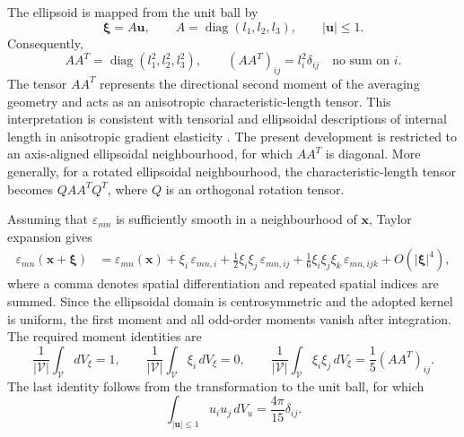 \documentclass[final,3p,times,fleqn]{elsarticle}
\begin{document}
The ellipsoid is mapped from the unit ball by
\[
  \boldsymbol{\xi}=A\mathbf{u},
  \qquad
  A=\operatorname{diag}(l_1,l_2,l_3),
  \qquad
  |\mathbf{u}|\leq 1 .
\]
Consequently,
\begin{equation}\label{eq:AAT}
  AA^T
  =
  \operatorname{diag}(l_1^2,l_2^2,l_3^2),
  \qquad
  (AA^T)_{ij}=l_i^2\delta_{ij}
  \quad \text{no sum on } i .
\end{equation}
The tensor $AA^T$ represents the directional second moment of the
averaging geometry and acts as an anisotropic characteristic-length
tensor. This interpretation is consistent with tensorial and ellipsoidal
descriptions of internal length in anisotropic gradient elasticity
\cite{LazarPo2015,Polizzotto2018,Auffray2019}. The present development
is restricted to an axis-aligned ellipsoidal neighbourhood, for which
$AA^T$ is diagonal. More generally, for a rotated ellipsoidal
neighbourhood, the characteristic-length tensor becomes
$QAA^TQ^T$, where $Q$ is an orthogonal rotation tensor.

Assuming that $\varepsilon_{mn}$ is sufficiently smooth in a
neighbourhood of $\mathbf{x}$, Taylor expansion gives
\begin{align}\label{eq:taylor}
\varepsilon_{mn}(\mathbf{x}+\boldsymbol{\xi})
&=
\varepsilon_{mn}(\mathbf{x})
+
\xi_i\,\varepsilon_{mn,i}
+
\frac{1}{2}\xi_i\xi_j\,\varepsilon_{mn,ij}
+
\frac{1}{6}\xi_i\xi_j\xi_k\,\varepsilon_{mn,ijk}
+
O(|\boldsymbol{\xi}|^4),
\end{align}
where a comma denotes spatial differentiation and repeated spatial
indices are summed. Since the ellipsoidal domain is centrosymmetric and
the adopted kernel is uniform, the first moment and all odd-order
moments vanish after integration. The required moment identities are
\begin{equation}\label{eq:moment_identities}
  \frac{1}{|\mathcal{V}|}
  \int_{\mathcal{V}}dV_{\xi}=1,
  \qquad
  \frac{1}{|\mathcal{V}|}
  \int_{\mathcal{V}}\xi_i\,dV_{\xi}=0,
  \qquad
  \frac{1}{|\mathcal{V}|}
  \int_{\mathcal{V}}\xi_i\xi_j\,dV_{\xi}
  =
  \frac{1}{5}(AA^T)_{ij}.
\end{equation}
The last identity follows from the transformation to the unit ball,
for which
\[
  \int_{|\mathbf{u}|\leq 1}u_i u_j\,dV_u
  =
  \frac{4\pi}{15}\delta_{ij}.
\]
\end{document}
